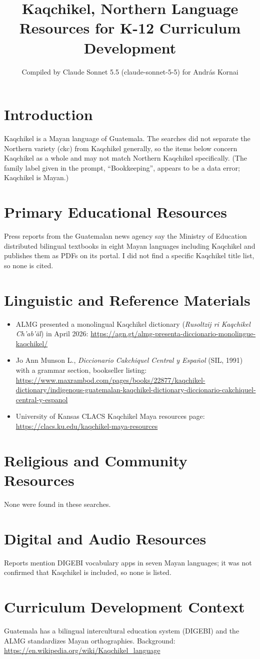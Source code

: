 \documentclass[12pt]{article}
\title{Kaqchikel, Northern Language Resources for K-12 Curriculum Development}
\author{Compiled by Claude Sonnet 5.5 (claude-sonnet-5-5) for Andr\'as Kornai}
\date{}
\begin{document}
\maketitle

\section{Introduction}
Kaqchikel is a Mayan language of Guatemala. The searches did not separate the Northern variety (ckc) from Kaqchikel generally, so the items below concern Kaqchikel as a whole and may not match Northern Kaqchikel specifically. (The family label given in the prompt, ``Bookkeeping'', appears to be a data error; Kaqchikel is Mayan.)

\section{Primary Educational Resources}
Press reports from the Guatemalan news agency say the Ministry of Education distributed bilingual textbooks in eight Mayan languages including Kaqchikel and publishes them as PDFs on its portal. I did not find a specific Kaqchikel title list, so none is cited.

\section{Linguistic and Reference Materials}
\begin{itemize}
\item ALMG presented a monolingual Kaqchikel dictionary (\emph{Rusoltzij ri Kaqchikel Ch'ab'\"al}) in April 2026: \url{https://agn.gt/almg-presenta-diccionario-monolingue-kaqchikel/}
\item Jo Ann Munson L., \emph{Diccionario Cakchiquel Central y Espa\~nol} (SIL, 1991) with a grammar section, bookseller listing: \url{https://www.maxrambod.com/pages/books/22877/kaqchikel-dictionary/indigenous-guatemalan-kaqchikel-dictionary-diccionario-cakchiquel-central-y-espanol}
\item University of Kansas CLACS Kaqchikel Maya resources page: \url{https://clacs.ku.edu/kaqchikel-maya-resources}
\end{itemize}

\section{Religious and Community Resources}
None were found in these searches.

\section{Digital and Audio Resources}
Reports mention DIGEBI vocabulary apps in seven Mayan languages; it was not confirmed that Kaqchikel is included, so none is listed.

\section{Curriculum Development Context}
Guatemala has a bilingual intercultural education system (DIGEBI) and the ALMG standardizes Mayan orthographies. Background: \url{https://en.wikipedia.org/wiki/Kaqchikel_language}
\end{document}
